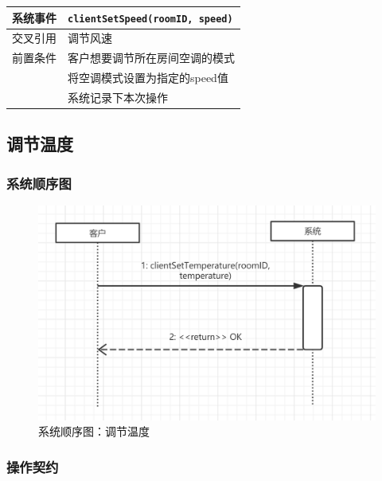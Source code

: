 \documentclass[black,normal,cn]{elegantnote}
\newcommand{\code}[1]{\colorbox{light-gray}{\texttt{#1}}}
\begin{document}
\begin{center}
    \begin{tabular}{|>{\centering}m{}|m{}|}
        \hline
        系统事件 & \multicolumn{1}{l|}{\code{clientSetSpeed(roomID, speed)}} \\
        \hline
        交叉引用 & 调节风速                                                  \\
        \hline
        前置条件 & 客户想要调节所在房间空调的模式                            \\
        \hline
        \multirow{2}{*}{后置条件}
                 & 将空调模式设置为指定的speed值                             \\
        \cline{2-2}
                 & 系统记录下本次操作                                        \\
        \hline
    \end{tabular}
\end{center}



\subsection{调节温度}

\subsubsection{系统顺序图}

\begin{figure}[H]
    \centering
    \includegraphics[width=.8\textwidth]{fig/250006.png}
    \caption{系统顺序图：调节温度}
    \label{fig:250006}
\end{figure}

\subsubsection{操作契约}
\end{document}
